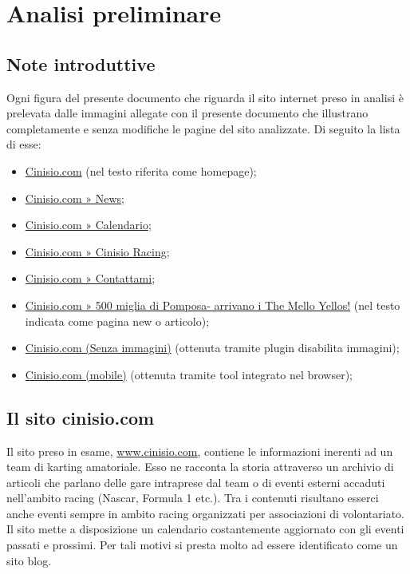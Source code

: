 
\section{Analisi preliminare}

	\subsection{Note introduttive}
		Ogni figura del presente documento che riguarda il sito internet preso in analisi è prelevata dalle immagini allegate con il presente documento che illustrano completamente e senza modifiche le pagine del sito analizzate. Di seguito la lista di esse:
		\begin{itemize}
			\item \href{http://www.cinisio.com/}{Cinisio.com} (nel testo riferita come homepage);
			\item \href{http://www.cinisio.com/news}{Cinisio.com » News};
			\item \href{http://www.cinisio.com/racing/calendario}{Cinisio.com » Calendario};\\
			\item \href{http://www.cinisio.com/racing}{Cinisio.com » Cinisio Racing};
			\item \href{http://www.cinisio.com/contattami}{Cinisio.com » Contattami};
			\item \href{http://www.cinisio.com/2016/500-miglia-di-pomposa-unimpresa-quasi-riuscita/}{Cinisio.com » 500 miglia di Pomposa- arrivano i The Mello Yellos!} (nel testo indicata come pagina new o articolo);
			\item \href{}{Cinisio.com (Senza immagini)} (ottenuta tramite plugin disabilita immagini);
			\item \href{}{Cinisio.com (mobile)} (ottenuta tramite tool integrato nel browser);
		\end{itemize}

	\subsection{Il sito cinisio.com}
		Il sito preso in esame, \href{http://www.cinisio.com/}{www.cinisio.com}, contiene le informazioni inerenti ad un team di karting amatoriale. Esso ne racconta la storia attraverso un archivio di articoli che parlano delle gare intraprese dal team o di eventi esterni accaduti nell'ambito racing (Nascar, Formula 1 etc.). Tra i contenuti risultano esserci anche eventi sempre in ambito racing organizzati per associazioni di volontariato. Il sito mette a disposizione un calendario costantemente aggiornato con gli eventi passati e prossimi. Per tali motivi si presta molto ad essere identificato come un sito blog.
		
